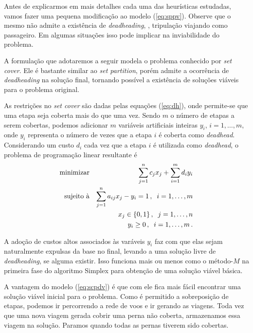 Antes de explicarmos em mais detalhes cada uma das heurísticas estudadas, vamos fazer uma pequena
modificação ao modelo (\ref{eq:sppv}). Observe que o mesmo não admite a existência de {\it
deadheading}, \ie, tripulação viajando como passageiro. Em algumas situações isso pode implicar na
inviabilidade do problema.

A formulação que adotaremos a seguir modela o problema conhecido por {\it set cover}. Ele é bastante
similar ao {\it set partition}, porém admite a ocorrência de {\it deadheading} na solução final,
tornando possível a existência de soluções viáveis para o problema original.

As restrições no {\it set cover} são dadas pelas equações (\ref{eq:dh}), onde permite-se que 
uma etapa seja coberta mais do que uma vez. Sendo $m$ o número de etapas a serem cobertas, podemos 
adicionar $m$ variáveis artificiais inteiras $y_i$, $i = 1, \ldots, m$, onde $y_i$ representa o 
número de vezes que a etapa $i$ é coberta como {\it deadhead}. Considerando um custo $d_i$ cada vez 
que a etapa $i$ é utilizada como {\it deadhead}, o problema de programação linear resultante é
%
\begin{eqnarray} \label{eq:scpdv}
	\text{minimizar} && \displaystyle \sum_{j=1}^n c_j x_j + \sum_{i=1}^m d_i y_i \nonumber \\
	\text{sujeito à} && \displaystyle \sum_{j=1}^n a_{ij} x_j - y_i = 1 \, , \;\; i = 1, \ldots, m \\
	                 && x_j \in \{0, 1\} \, , \;\; j = 1, \ldots, n \nonumber \\
	                 && y_i \geq 0 \, , \;\; i = 1, \ldots, m \, . \nonumber
\end{eqnarray}

A adoção de custos altos associados às varáveis $y_i$ faz com que elas sejam naturalmente expulsas 
da base no final, levando a uma solução livre de {\it deadheading}, se alguma existir. Isso funciona
mais ou menos como o método-$M$ na primeira fase do algoritmo Simplex para obtenção de uma solução 
viável básica.

A vantagem do modelo (\ref{eq:scpdv}) é que com ele fica mais fácil encontrar uma solução viável
inicial para o problema. Como é permitido a sobreposição de etapas, podemos ir percorrendo a rede
de voos e ir gerando as viagens. Toda vez que uma nova viagem gerada cobrir uma perna não coberta,
armazenamos essa viagem na solução. Paramos quando todas as pernas tiverem sido cobertas.


